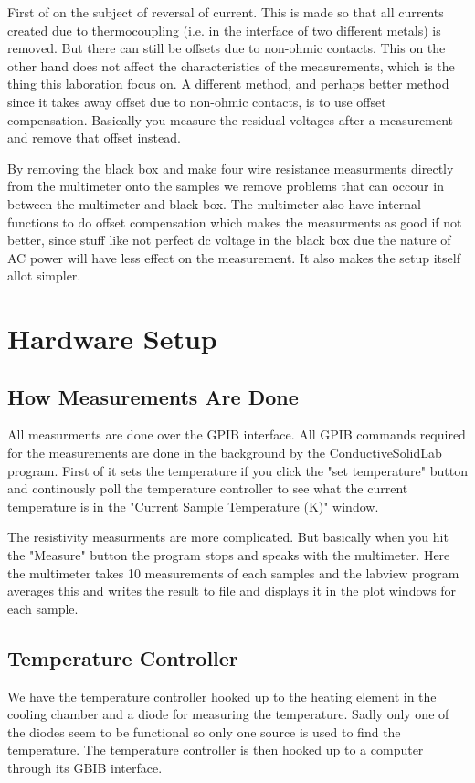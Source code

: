 \documentclass[a4paper,12pt]{article}
\begin{document}
First of on the subject of reversal of current. This is made so that all currents created due to thermocoupling (i.e. in the interface of two different metals) is removed. But there can still be offsets due to non-ohmic contacts. This on the other hand does not affect the characteristics of the measurements, which is the thing this laboration focus on. A different method, and perhaps better method since it takes away offset due to non-ohmic contacts, is to use offset compensation. Basically you measure the residual voltages after a measurement and remove that offset instead.

By removing the black box and make four wire resistance measurments directly from the multimeter onto the samples we remove problems that can occour in between the multimeter and black box. The multimeter also have internal functions to do offset compensation which makes the measurments as good if not better, since stuff like not perfect dc voltage in the black box due the nature of AC power will have less effect on the measurement. It also makes the setup itself allot simpler.  

\section{Hardware Setup}
\subsection{How Measurements Are Done}
All measurments are done over the GPIB interface. All GPIB commands required for the measurements are done in the background by the ConductiveSolidLab program. First of it sets the temperature if you click the "set temperature" button and continously poll the temperature controller to see what the current temperature is in the "Current Sample Temperature (K)" window. 

The resistivity measurments are more complicated. But basically when you hit the "Measure" button the program stops and speaks with the multimeter. Here the multimeter takes 10 measurements of each samples and the labview program averages this and writes the result to file and displays it in the plot windows for each sample. 

\subsection{Temperature Controller}
We have the temperature controller hooked up to the heating element in the cooling chamber and a diode for measuring the temperature. Sadly only one of the diodes seem to be functional so only one source is used to find the temperature. The temperature controller is then hooked up to a computer through its GBIB interface.
\end{document}
